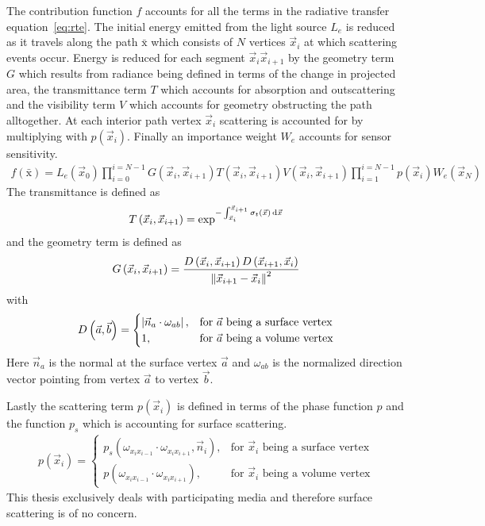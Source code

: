 The contribution function $f$ accounts for all the terms in the radiative transfer equation~\ref{eq:rte}. The initial energy emitted from the light source $L_e$ is reduced as it travels along the path $\bar{\mathrm{x}}$ which consists of $N$ vertices $\vec{x}_i$ at which scattering events occur. Energy is reduced for each segment $\vec{x}_i \vec{x}_{i+1}$ by the geometry term $G$ which results from radiance being defined in terms of the change in projected area, the transmittance term $T$ which accounts for absorption and outscattering and the visibility term $V$ which accounts for geometry obstructing the path alltogether. At each interior path vertex $\vec{x}_i$ scattering is accounted for by multiplying with $p(\vec{x}_i)$. Finally an importance weight $W_e$ accounts for sensor sensitivity.
\begin{align}
f\left(\bar{\mathrm{x}}\right) =
L_e\left(\vec{x}_0\right)
\prod_{i=0}^{i=N-1}
G\left(\vec{x}_i, \vec{x}_{i+1}\right)
T\left(\vec{x}_i, \vec{x}_{i+1}\right)
V\left(\vec{x}_i, \vec{x}_{i+1}\right)
\prod_{i=1}^{i=N-1}
p\left(\vec{x}_i\right)
W_e\left(\vec{x}_N\right)
\end{align}
The transmittance is defined as
\begin{align}
T\left(\vec{x}_i, \vec{x}_{i+1}\right) =
\operatorname{exp}^
{
    -\int_{\vec{x}_i}^{\vec{x}_{i+1}}\sigma_t\left(\vec{x}\right)\,\mathrm{d}\vec{x}
}
\end{align}
and the geometry term is defined as
\begin{align}
G\left(\vec{x}_i, \vec{x}_{i+1}\right) =
\frac{D\left(\vec{x}_{i}, \vec{x}_{i+1}\right)D\left(\vec{x}_{i+1}, \vec{x}_{i}\right)}{\left\lVert\vec{x}_{i+1}-\vec{x}_{i}\right\rVert^2}
\end{align}
with
\begin{align}
D\left(\vec{a}, \vec{b}\right) =
\begin{cases}
\left\vert\vec{n}_a\cdot\omega_{ab}\right\vert, & \text{for $\vec{a}$ being a surface vertex}
\\
1, & \text{for $\vec{a}$ being a volume vertex}
\end{cases}
\end{align}
Here $\vec{n}_a$ is the normal at the surface vertex $\vec{a}$ and $\omega_{ab}$ is the normalized direction vector pointing from vertex $\vec{a}$ to vertex $\vec{b}$.

Lastly the scattering term $p(\vec{x}_i)$ is defined in terms of the phase function $p$ and the function $p_s$ which is accounting for surface scattering.
\begin{align}
p\left(\vec{x}_i\right) =
\begin{cases}
p_s\left(\omega_{x_ix_{i-1}}\cdot\omega_{x_ix_{i+1}}, \vec{n}_i\right), & \text{for $\vec{x}_i$ being a surface vertex}
\\
p\left(\omega_{x_ix_{i-1}}\cdot\omega_{x_ix_{i+1}}\right), & \text{for $\vec{x}_i$ being a volume vertex}
\end{cases}
\end{align}
This thesis exclusively deals with participating media and therefore surface scattering is of no concern.


